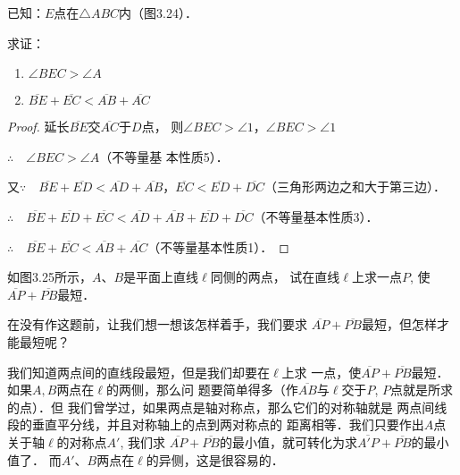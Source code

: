 \begin{example}
    已知：$E$点在$\triangle ABC$内（图3.24）．

求证： \begin{enumerate}
    \item $\angle BEC>\angle A$
    \item $\overline{BE}+\overline{EC}<\overline{AB}+\overline{AC}$
\end{enumerate} 
\end{example}

\begin{proof}
    延长$\overline{BE}$交$\overline{AC}$于$D$点，
则$\angle BEC>\angle 1$，$\angle BEC>\angle 1$

$\therefore\quad \angle BEC>\angle A$（不等量基
本性质5）．

又$\because\quad \overline{BE}+\overline{ED}<\overline{AD}+\overline{AB}$，$\overline{EC}<\overline{ED}+\overline{DC}$（三角形两边之和大于第三边）．

$\therefore\quad \overline{BE}+\overline{ED}+\overline{EC}<\overline{AD}+\overline{AB}+\overline{ED}+\overline{DC}$（不等量基本性质3）．

$\therefore\quad \overline{BE}+\overline{EC}<\overline{AB}+\overline{AC}$（不等量基本性质1）．
\end{proof}

\begin{example}
如图3.25所示，$A$、$B$是平面上直线$\ell$同侧的两点，
试在直线$\ell$上求一点$P$, 使$\overline{AP}+\overline{PB}$最短．

在没有作这题前，让我们想一想该怎样着手，我们要求
$\overline{AP}+\overline{PB}$最短，但怎样才能最短呢？

我们知道两点间的直线段最短，但是我们却要在$\ell$上求
一点，使$\overline{AP}+\overline{PB}$最短．如果$A,B$两点在$\ell$的两侧，那么问
题要简单得多（作$\overline{AB}$与$\ell$交于$P$, $P$点就是所求的点）．但
我们曾学过，如果两点是轴对称点，那么它们的对称轴就是
两点间线段的垂直平分线，并且对称轴上的点到两对称点的
距离相等．我们只要作出$A$点关于轴$\ell$的对称点$A'$, 我们求
$\overline{AP}+\overline{PB}$的最小值，就可转化为求$\overline{A'P}+\overline{PB}$的最小值了．
而$A'$、$B$两点在$\ell$的异侧，这是很容易的．

\begin{figure}[htp]
    \centering
{}
    \caption{}
\end{figure}
\end{example}



